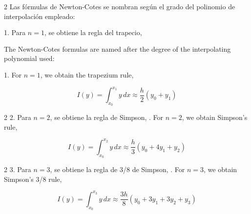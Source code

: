 \begin{paracol}{2}
Las fórmulas de Newton-Cotes se nombran según el grado del polinomio de interpolación empleado:

1. Para $n=1$, se obtiene la regla del trapecio,

\switchcolumn
The Newton-Cotes formulas are named after the degree of the interpolating polynomial used:

1. For $n=1$, we obtain the trapezium rule,
\end{paracol}
\begin{equation*}
I(y)=\int_{x_0}^{x_1}y\,dx \approx \frac{h}{2}(y_0+y_1)
\end{equation*}
\begin{paracol}{2}
2. Para $n=2$, se obtiene la regla de Simpson,
. For $n=2$, we obtain Simpson's rule,
\end{paracol}
\begin{equation*}
I(y)=\int_{x_0}^{x_2}y\,dx \approx \frac{h}{3}(y_0+4y_1+y_2)
\end{equation*}
\begin{paracol}{2}
3. Para $n=3$, se obtiene la regla de 3/8 de Simpson,
. For $n = 3$, we obtain Simpson's 3/8 rule,
\end{paracol}
\begin{equation*}
I(y)=\int_{x_0}^{x_3}y\,dx \approx \frac{3h}{8}(y_0+3y_1+3y_2+y_3)
\end{equation*}

